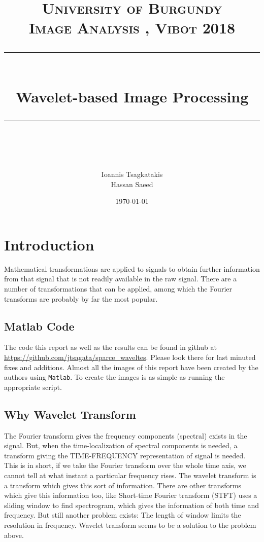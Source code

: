\documentclass[a4paper,12pt]{article}
\title{
\normalfont \normalsize 
\textsc{University of Burgundy \\ 
Image Analysis
, Vibot 2018} \\
[10pt] 
\rule{\linewidth}{0.5pt} \\[6pt] 
\huge Wavelet-based Image Processing \\
\rule{\linewidth}{2pt}  \\[10pt]
}
\author{Ioannis Tsagkatakis \\ Hassan Saeed}
\date{\normalsize \today}
\begin{document}
\maketitle
\noindent


\section{Introduction}
Mathematical transformations are applied to signals to obtain further information from that signal that is not readily available in the raw signal. There are a number of transformations that can be applied, among which the Fourier transforms are probably by far the most popular.


\subsection*{Matlab Code}
The code this report as well as the results can be found in  github at \url{https://github.com/jtsagata/sparce_waveltes}. Please look there for last minuted fixes and additions. Almost all the images of this report have been created by the authors using \texttt{Matlab}. To create the images is as simple as running the appropriate script.  

\subsection{Why Wavelet Transform }
The Fourier transform gives the frequency components (spectral) exists in the signal. But, when the time-localization of spectral components is needed, a transform giving the TIME-FREQUENCY representation of signal is needed. This is in short, if we take the Fourier transform over the whole time axis, we cannot tell at what instant a particular frequency rises. The wavelet transform is a transform which gives this sort of information. There are other transforms which give this information too, like Short-time Fourier transform (STFT) uses a sliding window to find spectrogram, which gives the information of both time and frequency. But still another problem exists: The length of window limits the resolution in frequency. Wavelet transform seems to be a solution to the problem above.
\end{document}
